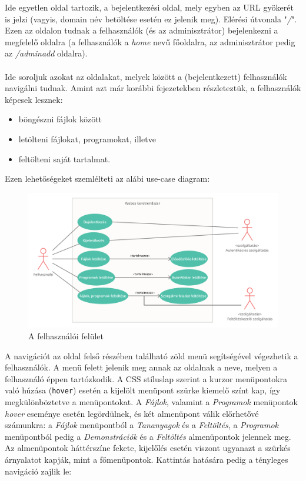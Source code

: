 Ide egyetlen oldal tartozik, a bejelentkezési oldal, mely egyben az URL gyökerét is jelzi (vagyis, domain név betöltése esetén ez jelenik meg). Elérési útvonala "\textit{/}". Ezen az oldalon tudnak a felhasználók (és az adminisztrátor) bejelenkezni a megfelelő oldalra (a felhasználók a \textit{home} nevű főoldalra, az adminisztrátor pedig az \textit{/adminadd} oldalra).\\

\\

Ide soroljuk azokat az oldalakat, melyek között a (bejelentkezett) felhasználók navigálni tudnak. Amint azt már korábbi fejezetekben részleteztük, a felhasználók képesek lesznek:

\begin{itemize}
\item{böngészni fájlok között}
\item{letölteni fájlokat, programokat, illetve}
\item{feltölteni saját tartalmat.}
\end{itemize}

Ezen lehetőségeket szemlélteti az alábi use-case diagram:

\begin{figure}[h]
	\centering
		\includegraphics[width=10truecm, height=7truecm]{images/felhasznalo_use_case.png}
	\caption{A felhasználói felület}
	\label{fig:login}
\end{figure}

A navigációt az oldal felső részében található zöld menü segítségével végezhetik a felhasználók. A menü felett jelenik meg annak az oldalnak a neve, melyen a felhasználó éppen tartózkodik. A CSS stíluslap szerint a kurzor menüpontokra való húzása (\texttt{hover}) esetén a kijelölt menüpont szürke kiemelő színt kap, így megkülönböztetve a menüpontokat. A \textit{Fájlok}, valamint a \textit{Programok} menüpontok \textit{hover} eseménye esetén legördülnek, és két almenüpont válik előrhetővé számunkra: a \textit{Fájlok} menüpontból a \textit{Tananyagok} és a \textit{Feltöltés}, a \textit{Programok} menüpontból pedig a \textit{Demonstrációk} és a \textit{Feltöltés} almenüpontok jelennek meg. Az almenüpontok háttérszíne fekete, kijelőlés esetén viszont ugyanazt a szürkés árnyalatot kapják, mint a főmenüpontok. Kattintás hatására pedig a tényleges navigáció zajlik le:

